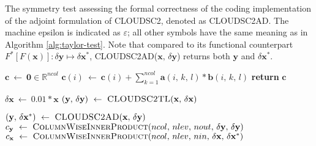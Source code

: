 \documentclass[main.tex]{subfiles}
\begin{document}
    \begin{algorithm}[t!]
        \caption{The symmetry test assessing the formal correctness of the coding implementation of the adjoint formulation of CLOUDSC2, denoted as \textsc{CLOUDSC2AD}. The machine epsilon is indicated as $\varepsilon$; all other symbols have the same meaning as in Algorithm \ref{alg:taylor-test}. Note that compared to its functional counterpart $F^* \left[ F \left( \boldsymbol{x} \right) \right] : \delta \boldsymbol{y} \mapsto \delta \boldsymbol{x}^*$, \textsc{CLOUDSC2AD($\mathbf{x}, \, \delta \mathbf{y}$)} returns both $\mathbf{y}$ and $\delta \mathbf{x}^*$.}
        \label{alg:symmetry-test}
    
        \begin{algorithmic}[1]
             
                \State $\boldsymbol{c} ~ \gets ~ \mathbf{0} \in \mathbb{R}^{ncol}$
                        \State $\boldsymbol{c}(i) ~ \gets ~ \boldsymbol{c}(i) + \sum_{k=1}^{ncol} \mathbf{a} \left( i, \, k, \, l \right) * \mathbf{b} \left( i, \, k, \, l \right)$
                    \EndFor
                \EndFor
                \State \textbf{return} $\boldsymbol{c}$
            \EndFunction
    
            \Statex
            
             
    
            \State $\delta \mathbf{x} ~ \gets ~ 0.01 * \mathbf{x}$
            \State $\left( \mathbf{y}, \, \delta \mathbf{y} \right) ~ \gets ~ \Call{CLOUDSC2TL}{\mathbf{x}, \, \delta \mathbf{x}}$ 
            
            \State $\left( \mathbf{y}, \, \delta \mathbf{x}^* \right) ~ \gets ~ \Call{CLOUDSC2AD}{\mathbf{x}, \, \delta \mathbf{y}}$ 
            \State $\boldsymbol{c}_{\mathbf{y}} ~ \gets ~ \Call{ColumnWiseInnerProduct}{ncol, \, nlev, \, nout, \, \delta \mathbf{y}, \, \delta \mathbf{y}}$
            \State $\boldsymbol{c}_{\mathbf{x}} ~ \gets ~ \Call{ColumnWiseInnerProduct}{ncol, \, nlev, \, nin, \, \delta \mathbf{x}, \, \delta \mathbf{x}^*}$
    

\end{algorithmic}
\end{algorithm}
\end{document}
